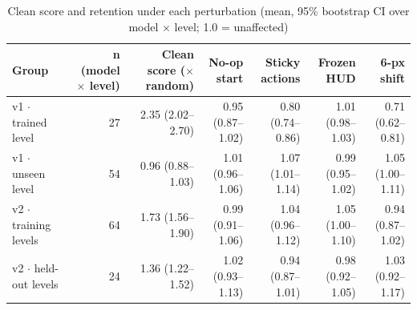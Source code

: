 \begin{table}[t]
\centering
\caption{Clean score and retention under each perturbation (mean, 95\% bootstrap CI over model $\times$ level; 1.0 = unaffected)}
\label{tab:robustness_summary}
\begin{tabular}{lrrrrrr}
\toprule
Group & n (model $\times$ level) & Clean score ($\times$ random) & No-op start & Sticky actions & Frozen HUD & 6-px shift \\
\midrule
v1 $\cdot$ trained level & 27 & 2.35 (2.02--2.70) & 0.95 (0.87--1.02) & 0.80 (0.74--0.86) & 1.01 (0.98--1.03) & 0.71 (0.62--0.81) \\
v1 $\cdot$ unseen level & 54 & 0.96 (0.88--1.03) & 1.01 (0.96--1.06) & 1.07 (1.01--1.14) & 0.99 (0.95--1.02) & 1.05 (1.00--1.11) \\
v2 $\cdot$ training levels & 64 & 1.73 (1.56--1.90) & 0.99 (0.91--1.06) & 1.04 (0.96--1.12) & 1.05 (1.00--1.10) & 0.94 (0.87--1.02) \\
v2 $\cdot$ held-out levels & 24 & 1.36 (1.22--1.52) & 1.02 (0.93--1.13) & 0.94 (0.87--1.01) & 0.98 (0.92--1.05) & 1.03 (0.92--1.17) \\
\bottomrule
\end{tabular}
\end{table}
